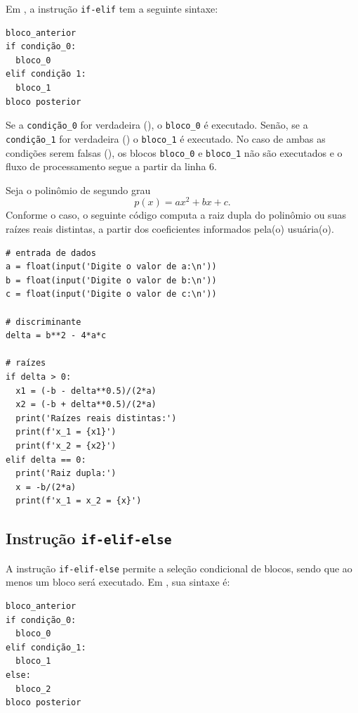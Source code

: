 Em {\python}, a instrução \lstinline+if-elif+ tem a seguinte sintaxe:

\begin{lstlisting}
bloco_anterior
if condição_0:
  bloco_0
elif condição 1:
  bloco_1
bloco posterior
\end{lstlisting}

Se a \lstinline+condição_0+ for verdadeira ({\PYTHONTrue}), o \lstinline+bloco_0+ é executado. Senão, se a \lstinline+condição_1+ for verdadeira ({\PYTHONTrue}) o \lstinline+bloco_1+ é executado. No caso de ambas as condições serem falsas ({\PYTHONFalse}), os blocos \lstinline+bloco_0+ e \lstinline+bloco_1+ não são executados e o fluxo de processamento segue a partir da linha 6.

\begin{ex}
  Seja o polinômio de segundo grau
  \begin{equation}
    p(x) = ax^2 + bx + c.
  \end{equation}
  Conforme o caso, o seguinte código computa a raiz dupla do polinômio ou suas raízes reais distintas, a partir dos coeficientes informados pela(o) usuária(o).

\begin{lstlisting}
# entrada de dados
a = float(input('Digite o valor de a:\n'))
b = float(input('Digite o valor de b:\n'))
c = float(input('Digite o valor de c:\n'))

# discriminante
delta = b**2 - 4*a*c

# raízes
if delta > 0:
  x1 = (-b - delta**0.5)/(2*a)
  x2 = (-b + delta**0.5)/(2*a)
  print('Raízes reais distintas:')
  print(f'x_1 = {x1}')
  print(f'x_2 = {x2}')
elif delta == 0:
  print('Raiz dupla:')
  x = -b/(2*a)
  print(f'x_1 = x_2 = {x}')
\end{lstlisting}

\end{ex}

\subsection{Instrução \texttt{if-elif-else}}

A instrução \lstinline+if-elif-else+ permite a seleção condicional de blocos, sendo que ao menos um bloco será executado. Em {\python}, sua sintaxe é:

\begin{lstlisting}
bloco_anterior
if condição_0:
  bloco_0
elif condição_1:
  bloco_1
else:
  bloco_2
bloco posterior
\end{lstlisting}

